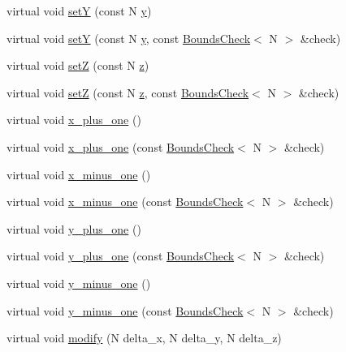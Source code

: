 \begin{DoxyCompactItemize}
\item 
virtual void \hyperlink{struct_position_ab816c27eddb9c5d4951edfbb78dc7233}{set\-Y} (const N \hyperlink{struct_position_af434f54a0aad8bbfc3806ebdd197aa3b}{y})
\item 
virtual void \hyperlink{struct_position_a45f946eeadc660099a5c38f882e9074e}{set\-Y} (const N \hyperlink{struct_position_af434f54a0aad8bbfc3806ebdd197aa3b}{y}, const \hyperlink{struct_bounds_check}{Bounds\-Check}$<$ N $>$ \&check)
\item 
virtual void \hyperlink{struct_position_aa2c5e74e13456b840ce39ae8fc09c59b}{set\-Z} (const N \hyperlink{struct_position_ac430da98504c2d4fd685c0363d728474}{z})
\item 
virtual void \hyperlink{struct_position_ac3dd191a672bd9696e6bb2ccf3a622e2}{set\-Z} (const N \hyperlink{struct_position_ac430da98504c2d4fd685c0363d728474}{z}, const \hyperlink{struct_bounds_check}{Bounds\-Check}$<$ N $>$ \&check)
\item 
virtual void \hyperlink{struct_position_aca2bf935dd53d012fe3529b81a111e23}{x\-\_\-plus\-\_\-one} ()
\item 
virtual void \hyperlink{struct_position_a86f84c270f732ee8a285f0d8672529ad}{x\-\_\-plus\-\_\-one} (const \hyperlink{struct_bounds_check}{Bounds\-Check}$<$ N $>$ \&check)
\item 
virtual void \hyperlink{struct_position_aa5715ebd88d355988b0c0cf03814a271}{x\-\_\-minus\-\_\-one} ()
\item 
virtual void \hyperlink{struct_position_ab96af6ce73be6d52132f4d4e5bf77485}{x\-\_\-minus\-\_\-one} (const \hyperlink{struct_bounds_check}{Bounds\-Check}$<$ N $>$ \&check)
\item 
virtual void \hyperlink{struct_position_a9d1ef5169f798099ab268f62c5acc9e1}{y\-\_\-plus\-\_\-one} ()
\item 
virtual void \hyperlink{struct_position_a4ac4b6f9dc9ab06e64ce7b16c5dcdfaa}{y\-\_\-plus\-\_\-one} (const \hyperlink{struct_bounds_check}{Bounds\-Check}$<$ N $>$ \&check)
\item 
virtual void \hyperlink{struct_position_a9979106cd4c31b19ecbb831a91ec218a}{y\-\_\-minus\-\_\-one} ()
\item 
virtual void \hyperlink{struct_position_a0c0ff46cc0329a0e0109084fb1856233}{y\-\_\-minus\-\_\-one} (const \hyperlink{struct_bounds_check}{Bounds\-Check}$<$ N $>$ \&check)
\item 
virtual void \hyperlink{struct_position_a71640a61fe271ddc9e2451037a11a86d}{modify} (N delta\-\_\-x, N delta\-\_\-y, N delta\-\_\-z)
\item 

\end{DoxyCompactItemize}
